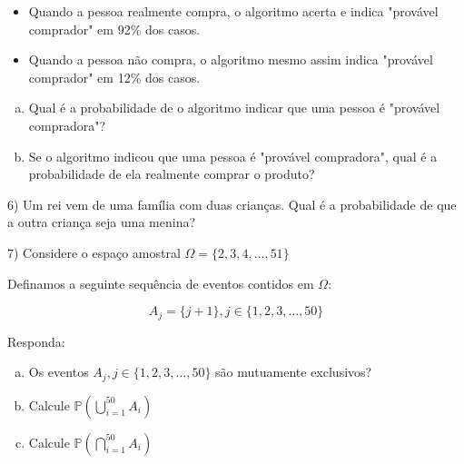 \documentclass[12pt]{article}
\begin{document}
\begin{itemize}
    \item Quando a pessoa realmente compra, o algoritmo acerta e indica "provável comprador" em 92\% dos casos.
    \item Quando a pessoa não compra, o algoritmo mesmo assim indica "provável comprador" em 12\% dos casos.
\end{itemize}

\begin{enumerate}[a)]
    \item Qual é a probabilidade de o algoritmo indicar que uma pessoa é "provável compradora"?  
    \item Se o algoritmo indicou que uma pessoa é "provável compradora", qual é a probabilidade de ela realmente comprar o produto?
\end{enumerate}

6) Um rei vem de uma família com duas crianças. Qual é a probabilidade de que a outra criança seja uma menina?

\vspace{5px}

7) Considere o espaço amostral $\Omega = \{2,3, 4, \dots, 51\} $

Definamos a seguinte sequência de eventos contidos em $\Omega$:

$$A_j = \{j + 1\}, j \in \{1,2,3, \dots, 50\}$$

Responda:

\begin{enumerate}[a)]
    \item Os eventos $A_j, j \in \{1,2,3, \dots, 50\}$ são mutuamente exclusivos?
    \item Calcule $\mathds{P}\left(\displaystyle\bigcup _{i=1}^{50} A_i \right)$
    \item Calcule $\mathds{P}\left(\displaystyle\bigcap _{i=1}^{50} A_i \right)$
\end{enumerate}
\end{document}
